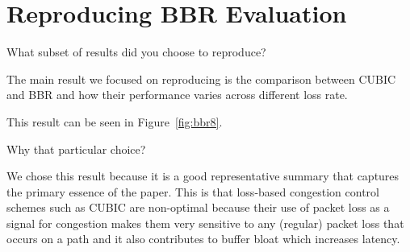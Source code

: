 
\section{Reproducing BBR Evaluation}

 What subset of results did you choose to reproduce?

The main result we focused on reproducing is the comparison between
CUBIC and BBR and how their performance varies across different loss
rate.

This result can be seen in  Figure~\ref{fig:bbr8}.

 Why that particular choice?

We chose this result because it is a good representative summary
that captures the primary essence of the paper. This is that
loss-based congestion control schemes such as CUBIC are non-optimal
because their use of packet loss as a signal for congestion makes them
very sensitive to any (regular) packet loss that occurs on a path and it
also contributes to buffer bloat which increases latency.



